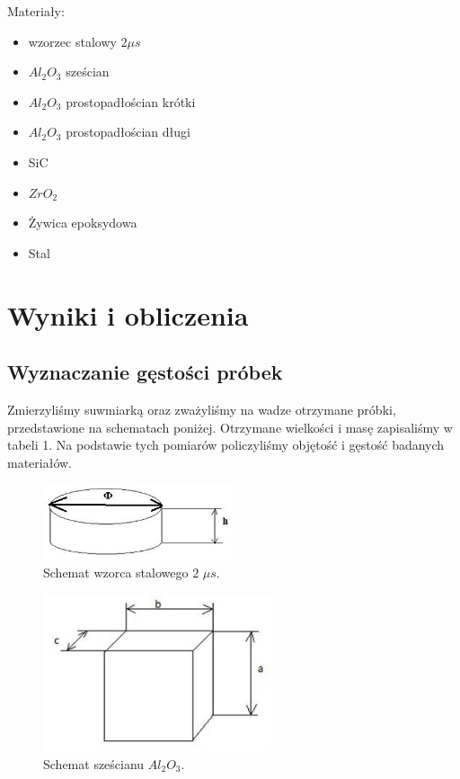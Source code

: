 \documentclass[a4paper,12pt]{article}
\begin{document}
 Materiały:
 
 \begin{itemize}
     \item wzorzec stalowy $2\mu s$
     \item $Al_2O_3$ sześcian 
     \item $Al_2O_3$ prostopadłościan krótki
     \item $Al_2O_3$ prostopadłościan długi 
     \item SiC
     \item $ZrO_2$
     \item Żywica epoksydowa 
     \item Stal 
 \end{itemize}
\newpage
 
\section{Wyniki i obliczenia}

\subsection{Wyznaczanie gęstości próbek}

Zmierzyliśmy suwmiarką oraz zważyliśmy na wadze otrzymane próbki, przedstawione na schematach poniżej. Otrzymane wielkości i masę zapisaliśmy w tabeli 1. 
Na podstawie tych pomiarów policzyliśmy objętość i gęstość badanych materiałów.

\begin{figure}[H]
    \centering
    \includegraphics[width=0.5\textwidth]{img/wzorzec.jpg}
    \caption{Schemat wzorca stalowego $2$ $\mu s$.}
\end{figure}

\begin{figure}[H]
    \centering
    \includegraphics[width=0.6\textwidth]{img/szescianAl2O3_SiC.jpg}
    \caption{Schemat sześcianu $Al_2O_3$.}
\end{figure}
\end{document}
